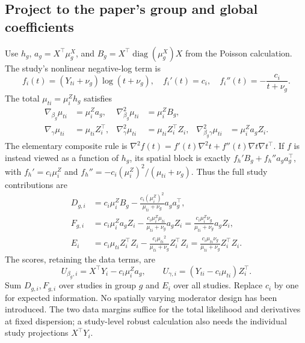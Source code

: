 \documentclass[11pt,a4paper]{article}
\newcommand{\diag}{\operatorname{diag}}
\numberwithin{equation}{section}
\begin{document}
\subsection{Project to the paper's group and global coefficients}
Use $h_g$, $a_g=X^\top \mu_g^X$, and $B_g=X^\top\diag(\mu_g^X)X$
from the Poisson calculation.
The study's nonlinear negative-log term is
\begin{equation}
 f_i(t)=(Y_{ti}+\nu_g)\log(t+\nu_g),\quad
 f_i'(t)=c_i,\quad f_i''(t)=-\frac{c_i}{t+\nu_g}.
\end{equation}
The total ${\mu_{ti}}=\mu_i^Zh_g$ satisfies
\begin{align}
 \nabla_{\beta_g}{\mu_{ti}}&=\mu_i^Za_g,&
 \nabla_{\beta_g}^2{\mu_{ti}}&=\mu_i^ZB_g,\\
 \nabla_\gamma {\mu_{ti}}&={\mu_{ti}}{Z_i^\top},&
 \nabla_\gamma^2{\mu_{ti}}&={\mu_{ti}}{Z_i^\top}{Z_i},&
 \nabla_{\beta_g\gamma}^2{\mu_{ti}}&=\mu_i^Za_g{Z_i}.
\end{align}
The elementary composite rule is
$\nabla^2 f(t)=f'(t)\nabla^2t+f''(t)\nabla t\nabla t^\top$.
If $f$ is instead viewed as a function of $h_g$, its spatial block
is exactly $f_h' B_g+f_h''a_ga_g^\top$, with
$f_h'=c_i\mu_i^Z$ and $f_h''=-c_i(\mu_i^Z)^2/({\mu_{ti}}+\nu_g)$.
Thus the full study contributions are
\begin{align}
 D_{g,i}&=c_i\mu_i^ZB_g-\frac{c_i(\mu_i^Z)^2}{{\mu_{ti}}+\nu_g}a_ga_g^\top,\\
 F_{g,i}&=c_i\mu_i^Za_g{Z_i}-
       \frac{c_i\mu_i^Z{\mu_{ti}}}{{\mu_{ti}}+\nu_g}a_g{Z_i}
       =\frac{c_i\mu_i^Z\nu_g}{{\mu_{ti}}+\nu_g}a_g{Z_i},\\
 E_i&=c_i{\mu_{ti}}{Z_i^\top}{Z_i}-
       \frac{c_i{\mu_{ti}}^2}{{\mu_{ti}}+\nu_g}{Z_i^\top}{Z_i}
       =\frac{c_i{\mu_{ti}}\nu_g}{{\mu_{ti}}+\nu_g}{Z_i^\top}{Z_i} . \label{eq:cluster-blocks}
\end{align}
The scores, retaining the data terms, are
\begin{equation}
 U_{\beta_g,i}=X^\top Y_i-c_i\mu_i^Za_g,\qquad
 U_{\gamma,i}=(Y_{ti}-c_i{\mu_{ti}}){Z_i^\top} .
\end{equation}
Sum $D_{g,i},F_{g,i}$ over studies in group $g$ and $E_i$ over all studies.
Replace $c_i$ by one for expected information.
No spatially varying moderator design has been introduced.
The two data margins suffice for the total likelihood and derivatives
at fixed dispersion; a study-level robust calculation also needs
the individual study projections $X^\top Y_i$.
\end{document}
